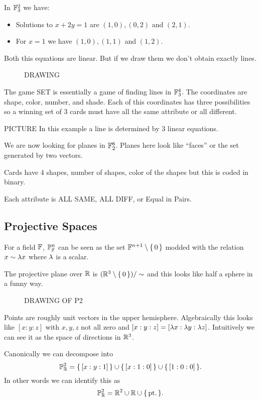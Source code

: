 \documentclass[12pt]{memoir}
\begin{document}
\begin{Ex}
    In $\mathbb{F}^2_3$ we have:
    \begin{itemize}
        \itemsep=-0.4em 
        \item Solutions to $x+2y=1$ are $(1,0),(0,2)$ and $(2,1)$.
        \item For $x=1$ we have $(1,0),(1,1)$ and $(1,2)$.
    \end{itemize}
    Both this equations are linear. But if we draw them we don't obtain exactly lines. 
    \begin{figure}
        DRAWING
    \end{figure}
\end{Ex}

\begin{Ex}
    The game SET is essentially a game of finding lines in $\mathbb{F}_3^4$. The coordinates are shape, color, number, and shade. Each of this coordinates has three possibilities so a winning set of 3 cards must have all the same attribute or all different.\par
    PICTURE In this example a line is determined by 3 linear equations.
\end{Ex}

\begin{Ex}
    We are now looking for planes in $\mathbb{F}_2^6$. Planes here look like ``faces'' or the set generated by two vectors.\par 
    Cards have 4 shapes, number of shapes, color of the shapes but this is coded in binary.\par 
    Each attribute is ALL SAME, ALL DIFF, or Equal in Pairs.
\end{Ex}

\subsection{Projective Spaces}

\begin{Def}
    For a field $\mathbb{F}$, $\mathbb{P}^n_{\mathbb{F}}$ can be seen as the set $\mathbb{F}^{n+1}\setminus\{\,0\,\}$ modded with the relation $x\sim\lambda x$ where $\lambda$ is a scalar.
\end{Def}

\begin{Ex}
    The projective plane over $\mathbb{R}$ is $(\mathbb{R}^3\setminus\{\,0\,\})/\sim$ and this looks like half a sphere in a funny way.
    \begin{figure}
        DRAWING OF P2
    \end{figure}
    Points are roughly unit vectors in the upper hemisphere. Algebraically this looks like $[x:y:z]$ with $x,y,z$ not all zero and $[x:y:z]=[\lambda x:\lambda y:\lambda z]$. Intuitively we can see it as the space of directions in $\mathbb{R}^3$.\par 
    Canonically we can decompose into 
    $$\mathbb{P}_{\mathbb{R}}^2=\{\,[x:y:1]\,\}\cup\{\,[x:1:0]\,\}\cup\{\,[1:0:0]\,\}.$$
    In other words we can identify this as 
    $$\mathbb{P}_{\mathbb{R}}^2=\mathbb{R}^2\cup\mathbb{R}\cup\{\,\text{pt.}\,\}.$$
\end{Ex}
\end{document}
